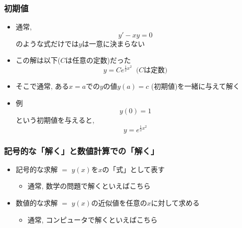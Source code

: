 \documentclass[12pt,dvipdfmx]{beamer}
\newcommand{\ao}[1]{{\color{blue}#1}}
\begin{document}
\begin{frame}
\frametitle{初期値}
\begin{itemize}
\item 通常, 
  \[ y' - x y = 0 \]
  のような式だけでは$y$は一意に決まらない
\item この解は以下($C$は任意の定数)だった
  \[ y = Ce^{\frac{1}{2}x^2} \;\; \mbox{($C$は定数)} \]
\item そこで通常,
  ある$x=a$での$y$の値$y(a)=c$ \ao{(初期値)}を一緒に与えて解く
\item 例
  \[ y(0) = 1 \]
  という初期値を与えると,
  \[ y = e^{\frac{1}{2}x^2} \]
\end{itemize}
\end{frame}

\begin{frame}
\frametitle{記号的な「解く」と数値計算での「解く」}
\begin{itemize}
\item 記号的な求解 $=$
  $y(x)$を$x$の「式」として表す
  \begin{itemize}
  \item 通常, 数学の問題で解くといえばこちら
  \end{itemize}
  
\item 数値的な求解 $=$
  \ao{$y(x)$の近似値を任意の$x$に対して求める}
  \begin{itemize}
  \item 通常, コンピュータで解くといえばこちら
  \end{itemize}
\end{itemize}
\end{frame}
\end{document}
